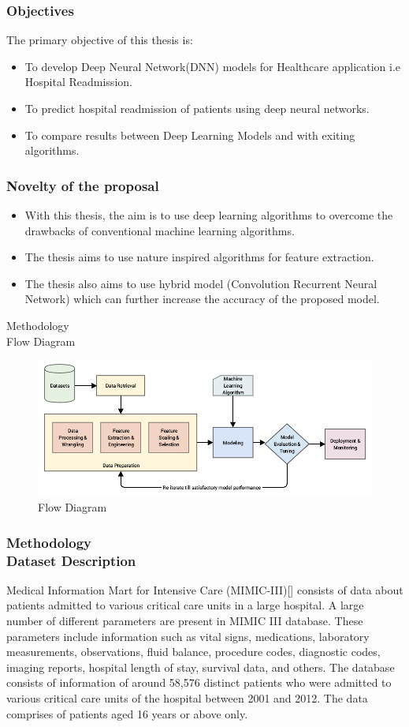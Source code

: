 \documentclass{beamer}
\begin{document}
\begin{frame}\frametitle{Objectives}
The primary objective of this thesis is:
    \begin{itemize}
        \item To develop Deep Neural Network(DNN) models for Healthcare application i.e Hospital Readmission.
        \item To predict hospital readmission of patients using deep neural networks.
        \item To compare results between Deep Learning Models and with exiting algorithms.
    \end{itemize}
\end{frame}

\begin{frame}\frametitle{Novelty of the proposal}
    \begin{itemize}
        \item With this thesis, the aim is to use deep learning algorithms to overcome the drawbacks of conventional machine learning algorithms.
        \item The thesis aims to use nature inspired algorithms for feature extraction.
        \item The thesis also aims to use hybrid model (Convolution Recurrent Neural Network) which can further increase the accuracy of the proposed model.
    \end{itemize}
\end{frame}
\begin{frame}{Methodology\\\footnotesize{Flow Diagram}}
    \begin{figure}[h]
        \centering
        \includegraphics[width=4.5in]{flowdiag.png}
        \caption{Flow Diagram}
        \label{fig:flowdiag}
    \end{figure}
\end{frame}
\begin{frame}\frametitle{Methodology\\\footnotesize{Dataset Description}}
Medical Information Mart for Intensive Care (MIMIC-III)[] consists of data about patients admitted to various critical care units in a large hospital.  A large number of different parameters
are present in MIMIC III database. These parameters include information such as vital signs, medications, laboratory measurements, observations, fluid balance, procedure
codes, diagnostic codes, imaging reports, hospital length of stay, survival data, and others. The database consists of information of around 58,576 distinct patients who were
admitted to various critical care units of the hospital between 2001 and 2012. The data comprises of patients aged 16 years or above only.

\end{frame}
\end{document}
